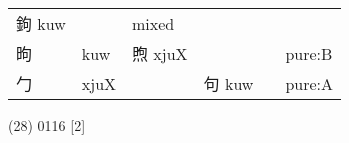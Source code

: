 \documentclass[14pt,a4paper]{scrartcl}
\begin{document}
\begin{longtable}[c]{@{}llllll@{}}
\begin{minipage}[t]{0.14\columnwidth}
鉤 kuw
\strut\end{minipage} &
\begin{minipage}[t]{0.14\columnwidth}\raggedright\strut
\strut\end{minipage} &
\begin{minipage}[t]{0.14\columnwidth}\raggedright\strut
mixed
\strut\end{minipage}\tabularnewline
\begin{minipage}[t]{0.14\columnwidth}\raggedright\strut
昫
\strut\end{minipage} &
\begin{minipage}[t]{0.14\columnwidth}\raggedright\strut
kuw
\strut\end{minipage} &
\begin{minipage}[t]{0.14\columnwidth}\raggedright\strut
煦 xjuX
\strut\end{minipage} &
\begin{minipage}[t]{0.14\columnwidth}\raggedright\strut
\strut\end{minipage} &
\begin{minipage}[t]{0.14\columnwidth}\raggedright\strut
\strut\end{minipage} &
\begin{minipage}[t]{0.14\columnwidth}\raggedright\strut
pure:B
\strut\end{minipage}\tabularnewline
\begin{minipage}[t]{0.14\columnwidth}\raggedright\strut
勹
\strut\end{minipage} &
\begin{minipage}[t]{0.14\columnwidth}\raggedright\strut
xjuX
\strut\end{minipage} &
\begin{minipage}[t]{0.14\columnwidth}\raggedright\strut
\strut\end{minipage} &
\begin{minipage}[t]{0.14\columnwidth}\raggedright\strut
句 kuw
\strut\end{minipage} &
\begin{minipage}[t]{0.14\columnwidth}\raggedright\strut
\strut\end{minipage} &
\begin{minipage}[t]{0.14\columnwidth}\raggedright\strut
pure:A
\strut\end{minipage}\tabularnewline
\bottomrule
\end{longtable}

(28) 0116 {[}2{]}
\end{document}
